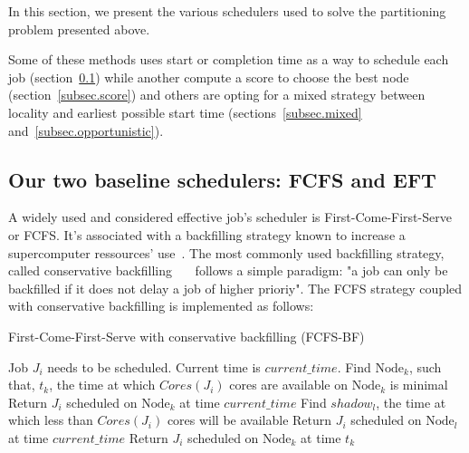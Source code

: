 \documentclass[conference,10pt]{IEEEtran}
\newcommand{\Node}[1]{\ensuremath{\mathrm{Node}_{#1}}\xspace}
\newcommand{\core}{\mathit{Cores}\xspace}
\newcommand{\walltime}{\mathit{Walltime}\xspace}
\newcommand{\nodeset}{\ensuremath{\mathbb{N}}\xspace}
\begin{document}
In this section, we present the various schedulers used to solve
the partitioning problem presented above. 

Some of these methods uses start or completion time as a way to
schedule each job (section~\ref{subsec.fcfs_eft}) while another compute 
a score to choose the best node (section~\ref{subsec.score}) and others
are opting for a mixed strategy between locality and earliest possible start time
(sections~\ref{subsec.mixed} and~\ref{subsec.opportunistic}).

\subsection{Our two baseline schedulers: FCFS and EFT}\label{subsec.fcfs_eft}

A widely used and considered effective job's scheduler is 
First-Come-First-Serve or FCFS.
It's associated with a backfilling strategy known to increase
a supercomputer ressources' use~\cite{maui}. 
The most commonly used backfilling strategy, called conservative 
backfilling~\cite{Characterization_of_Backfilling}~\cite{slurm_website_scheduling}~\cite{Introducing-New-Backfill-based} follows
a simple paradigm: "a job can only be backfilled if it does not
delay a job of higher prioriy".
The FCFS strategy coupled with conservative backfilling is implemented as follows:
\begin{algorithm}[htbp]
	\caption{First-Come-First-Serve with conservative backfilling (FCFS-BF)}\label{algo.fcfsbf}
	\begin{algorithmic}[1]
		\State Job $J_i$ needs to be scheduled. Current time is $current\_time$.
		\State Find $\Node{k}$, such that, $t_k$, the time at which $\core(J_i)$ cores are available on $\Node{k}$ is minimal
			\State Return $J_i$ scheduled on $\Node{k}$ at time $current\_time$
		\Else
			\ForEach{$\Node{l} \in \nodeset$}
				\State Find $shadow_l$, the time at which less than $\core(J_i)$ cores will be available
				\If{$current\_time + \walltime(J_i) \leq shadow_l$}
					\State Return $J_i$ scheduled on $\Node{l}$ at time $current\_time$
				\EndIf
			\EndFor
			\State Return $J_i$ scheduled on $\Node{k}$ at time $t_k$
		\EndIf
	\end{algorithmic}
\end{algorithm}
\end{document}
